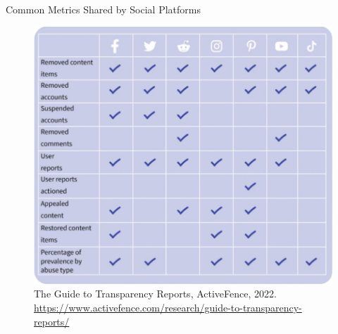 \documentclass[nobackground,dvipsnames,table]{beamer}
\begin{document}
\begin{frame}{Common Metrics Shared by Social Platforms}
\begin{figure}
    \centering
    \includegraphics[scale = 0.4]{img/subfig1.jpg}
    \caption{The Guide to Transparency Reports, ActiveFence, 2022. \href{https://www.activefence.com/research/guide-to-transparency-reports/}{https://www.activefence.com/research/guide-to-transparency-reports/}}
\end{figure}

\end{frame}
\end{document}
